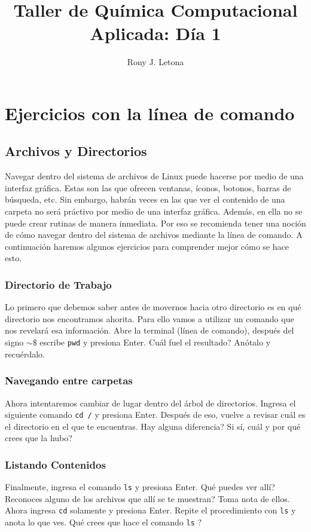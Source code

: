 \documentclass[10pt,letterpaper]{article}
\author{Rony J. Letona}
\title{Taller de Qu\'imica Computacional Aplicada: D\'ia 1}
\newcommand{\inlinecode}[1]{
\colorbox{light-gray}{\texttt{#1}}
}
\begin{document}
\maketitle

\section{Ejercicios con la l\'inea de comando}

\subsection{Archivos y Directorios}
Navegar dentro del sistema de archivos de Linux puede hacerse por medio de una interfaz gr\'afica. Estas son las que ofrecen ventanas, \'iconos, botonos, barras de b\'usqueda, etc. Sin embargo, habr\'an veces en las que ver el contenido de una carpeta no ser\'a pr\'activo por medio de una interfaz gr\'afica. Adem\'as, en ella no se puede crear rutinas de manera inmediata. Por eso se recomienda tener una noci\'on de c\'omo navegar dentro del sistema de archivos mediante la l\'inea de comando. A continuaci\'on haremos algunos ejercicios para comprender mejor c\'omo se hace esto.

\subsubsection{Directorio de Trabajo}
Lo primero que debemos saber antes de movernos hacia otro directorio es en qu\'e directorio nos encontramos ahorita. Para ello vamos a utilizar un comando que nos revelar\'a esa informaci\'on. Abre la terminal (l\'inea de comando), despu\'es del signo \inlinecode{$\sim\$ $} escribe \inlinecode{pwd} y presiona Enter. Cu\'al fuel el resultado? An\'otalo y recu\'erdalo.

\subsubsection{Navegando entre carpetas}
Ahora intentaremos cambiar de lugar dentro del \'arbol de directorios. Ingresa el siguiente comando \inlinecode{cd /} y presiona Enter. Despu\'es de eso, vuelve a revisar cu\'al es el directorio en el que te encuentras. Hay alguna diferencia? Si s\'i, cu\'al y por qu\'e crees que la hubo?

\subsubsection{Listando Contenidos}
Finalmente, ingresa el comando \inlinecode{ls} y presiona Enter. Qu\'e puedes ver all\'i? Reconoces alguno de los archivos que all\'i se te muestran? Toma nota de ellos. Ahora ingresa \inlinecode{cd} solamente y presiona Enter. Repite el procedimiento con \inlinecode{ls} y anota lo que ves. Qu\'e crees que hace el comando \inlinecode{ls}?
\end{document}
